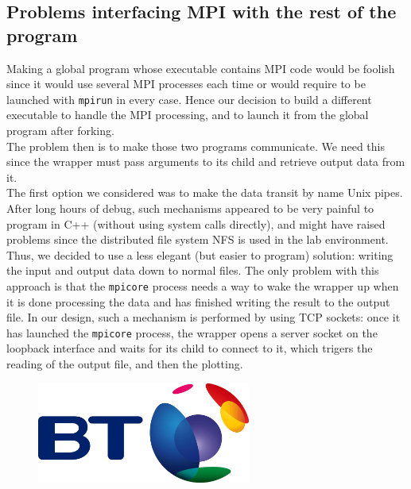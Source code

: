 \documentclass[11pt,a4paper]{article}
\begin{document}
\subsection*{Problems interfacing MPI with the rest of the program}

Making a global program whose executable contains MPI code would be foolish since it would use several MPI processes each time or would require to be launched with \verb_mpirun_ in every case. Hence our decision to build a different executable to handle the MPI processing, and to launch it from the global program after forking.\\

The problem then is to make those two programs communicate. We need this since the wrapper must pass arguments to its child and retrieve output data from it.\\

The first option we considered was to make the data transit by name Unix pipes. After long hours of debug, such mechanisms appeared to be very painful to program in C++ (without using system calls directly), and might have raised problems since the distributed file system NFS is used in the lab environment.\\

Thus, we decided to use a less elegant (but easier to program) solution: writing the input and output data down to normal files. The only problem with this approach is that the \verb_mpicore_ process needs a way to wake the wrapper up when it is done processing the data and has finished writing the result to the output file. In our design, such a mechanism is performed by using TCP sockets: once it has launched the \verb_mpicore_ process, the wrapper opens a server socket on the loopback interface and waits for its child to connect to it, which trigers the reading of the output file, and then the plotting.

\newpage


\begin{figure}[!h]
\includegraphics[width=7cm]{bt.jpg}
\end{figure}
\end{document}
